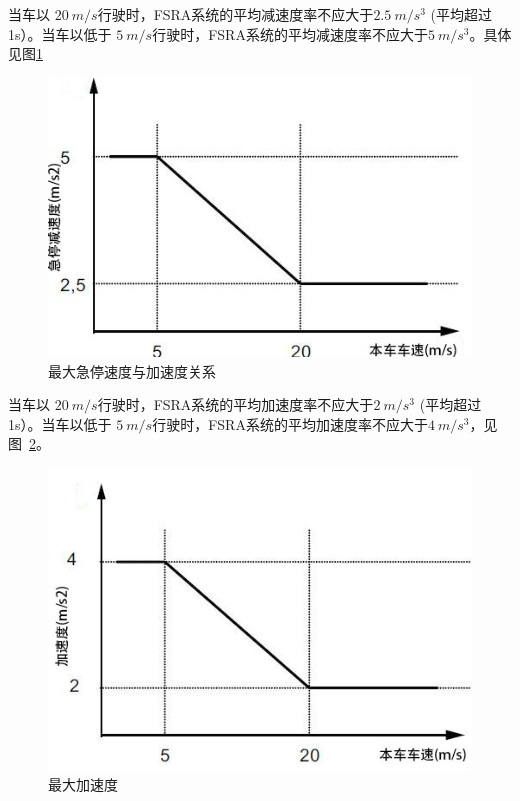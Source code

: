 \documentclass[is,copyright,is]{isov2}
\begin{document}
当车以 $\SI{20}{m/s}$行驶时，FSRA系统的平均减速度率不应大于$\SI{2.5}{m/s^3}$ (平均超过1s）。当车以低于 $\SI{5}{m/s}$行驶时，FSRA系统的平均减速度率不应大于$\SI{5}{m/s^3}$。具体见图\ref{fig:jerkmax}
\begin{figure}[htbp]
	\centering
	\includegraphics[width=0.7\linewidth]{figures/jerkmax}
	\caption{最大急停速度与加速度关系}
	\label{fig:jerkmax}
\end{figure}


当车以 $\SI{20}{m/s}$行驶时，FSRA系统的平均加速度率不应大于$\SI{2}{m/s^3}$ (平均超过1s）。当车以低于 $\SI{5}{m/s}$行驶时，FSRA系统的平均加速度率不应大于$\SI{4}{m/s^3}$，见图~\ref{fig:amax}。
\begin{figure}[htbp]
	\centering
	\includegraphics[width=0.7\linewidth]{figures/amax}
	\caption{最大加速度}
	\label{fig:amax}
\end{figure}
\end{document}
